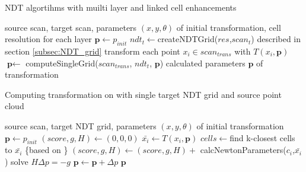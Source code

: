 \begin{algorithm}
\label{alg:p2d_ndt}
    \caption{\gls{NDT} algortihms with muilti layer and linked cell enhancements}
\begin{algorithmic}[1]
 \Require source scan, target scan,  parameters $(x,y,\theta)$ of initial transformation, cell resolution for each layer
	 \State $\textbf{p} \gets p_{init}$
		 \State $ndt_{t} \gets$createNDTGrid($res$,$scan_{t}$)
		 \Comment described in section \ref{subsec:NDT_grid}
		 \State transform each point $x_{i} \in scan_{trans}$ with $T(x_{i},\textbf{p})$
		 \State $\textbf{p} \gets$ computeSingleGrid($scan_{trans}$, $ndt_{t}$, $\textbf{p}$)
	 \EndFor
	 \State \Return calculated parameters $\textbf{p}$ of transformation
 \EndFunction
\end{algorithmic}
\end{algorithm}
\begin{algorithm}
\label{alg:p2d_ndt_single}
\caption{Computing transformation on with single target \gls{NDT} grid and source point cloud}
\begin{algorithmic}[1]
 \Require source scan, target NDT grid,  parameters $(x,y,\theta)$ of initial transformation
		 \State $\textbf{p} \gets p_{init}$
		 \State $(score, g,H) \gets (0,0,0)$
			 \State $\bar{x_{i}} \gets T(x_{i},\textbf{p})$
			 \State $cells \gets $find k-closest cells to $\bar{x_{i}} $
			 \State \{based on \cite{magnusson09}\}
				 \State $(score,g,H) \gets (score,g,H)  + $ calcNewtonParameters($c_{i}$,$\bar{x_{i}}$)
			 \EndFor 
		 \EndFor
		 \State solve $H\varDelta p = - g$
		 \State $\textbf{p} \gets \textbf{p} + \varDelta p$
	 \EndWhile
	 \State \Return $\textbf{p}$
 \EndFunction
\end{algorithmic}
\end{algorithm}
         
 
\newpage
